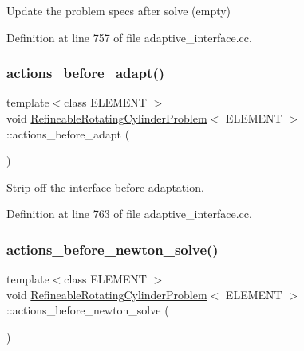 Update the problem specs after solve (empty) 



Definition at line 757 of file adaptive\+\_\+interface.\+cc.

\mbox{\label{classRefineableRotatingCylinderProblem_a705922ef2d96697ea5a110a412db5287}} 
\subsubsection{\texorpdfstring{actions\+\_\+before\+\_\+adapt()}{actions\_before\_adapt()}}
{\footnotesize\ttfamily template$<$class E\+L\+E\+M\+E\+NT $>$ \\
void \hyperlink{classRefineableRotatingCylinderProblem}{Refineable\+Rotating\+Cylinder\+Problem}$<$ E\+L\+E\+M\+E\+NT $>$\+::actions\+\_\+before\+\_\+adapt (\begin{DoxyParamCaption}{ }\end{DoxyParamCaption})\hspace{0.3cm}{\ttfamily [inline]}}



Strip off the interface before adaptation. 



Definition at line 763 of file adaptive\+\_\+interface.\+cc.

\mbox{\label{classRefineableRotatingCylinderProblem_a382bc388316b410c45f337558b5ad577}} 
\subsubsection{\texorpdfstring{actions\+\_\+before\+\_\+newton\+\_\+solve()}{actions\_before\_newton\_solve()}}
{\footnotesize\ttfamily template$<$class E\+L\+E\+M\+E\+NT $>$ \\
void \hyperlink{classRefineableRotatingCylinderProblem}{Refineable\+Rotating\+Cylinder\+Problem}$<$ E\+L\+E\+M\+E\+NT $>$\+::actions\+\_\+before\+\_\+newton\+\_\+solve (\begin{DoxyParamCaption}{ }\end{DoxyParamCaption})\hspace{0.3cm}{\ttfamily [inline]}}



